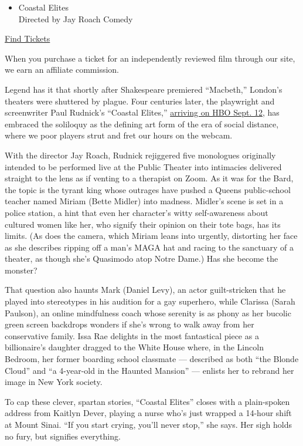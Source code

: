\begin{itemize}
\tightlist
\item
  Coastal Elites\\
  Directed by Jay Roach Comedy
\end{itemize}

\href{https://www.imdb.com/showtimes/title/tt12587564?ref_=ref_ext_NYT}{Find
Tickets}

When you purchase a ticket for an independently reviewed film through
our site, we earn an affiliate commission.

Legend has it that shortly after Shakespeare premiered ``Macbeth,''
London's theaters were shuttered by plague. Four centuries later, the
playwright and screenwriter Paul Rudnick's ``Coastal Elites,''
\href{https://www.hbo.com/specials/coastal-elites}{arriving on HBO Sept.
12}, has embraced the soliloquy as the defining art form of the era of
social distance, where we poor players strut and fret our hours on the
webcam.

With the director Jay Roach, Rudnick rejiggered five monologues
originally intended to be performed live at the Public Theater into
intimacies delivered straight to the lens as if venting to a therapist
on Zoom. As it was for the Bard, the topic is the tyrant king whose
outrages have pushed a Queens public-school teacher named Miriam (Bette
Midler) into madness. Midler's scene is set in a police station, a hint
that even her character's witty self-awareness about cultured women like
her, who signify their opinion on their tote bags, has its limits. (As
does the camera, which Miriam leans into urgently, distorting her face
as she describes ripping off a man's MAGA hat and racing to the
sanctuary of a theater, as though she's Quasimodo atop Notre Dame.) Has
she become the monster?

That question also haunts Mark (Daniel Levy), an actor guilt-stricken
that he played into stereotypes in his audition for a gay superhero,
while Clarissa (Sarah Paulson), an online mindfulness coach whose
serenity is as phony as her bucolic green screen backdrops wonders if
she's wrong to walk away from her conservative family. Issa Rae delights
in the most fantastical piece as a billionaire's daughter dragged to the
White House where, in the Lincoln Bedroom, her former boarding school
classmate --- described as both ``the Blonde Cloud'' and ``a 4-year-old
in the Haunted Mansion'' --- enlists her to rebrand her image in New
York society.

To cap these clever, spartan stories, ``Coastal Elites'' closes with a
plain-spoken address from Kaitlyn Dever, playing a nurse who's just
wrapped a 14-hour shift at Mount Sinai. ``If you start crying, you'll
never stop,'' she says. Her sigh holds no fury, but signifies
everything.

